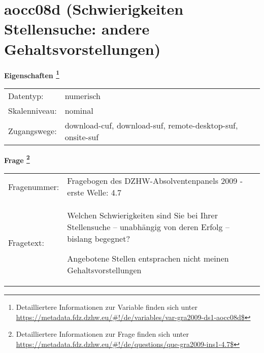 
    \setcounter{footnote}{0}

    \vspace*{-1.8cm}
	\section{aocc08d (Schwierigkeiten Stellensuche: andere Gehaltsvorstellungen)}
	\label{section:aocc08d}



    \vspace*{0.5cm}
    \noindent\textbf{Eigenschaften
	\footnote{Detailliertere Informationen zur Variable finden sich unter
		\url{https://metadata.fdz.dzhw.eu/\#!/de/variables/var-gra2009-ds1-aocc08d$}}}\\
	\begin{tabularx}{\hsize}{@{}lX}
	Datentyp: & numerisch \\
	Skalenniveau: & nominal \\
	Zugangswege: &
	  download-cuf, 
	  download-suf, 
	  remote-desktop-suf, 
	  onsite-suf
 \\
    \end{tabularx}



				\vspace*{0.5cm}
                \noindent\textbf{Frage
	                \footnote{Detailliertere Informationen zur Frage finden sich unter
		              \url{https://metadata.fdz.dzhw.eu/\#!/de/questions/que-gra2009-ins1-4.7$}}}\\
				\begin{tabularx}{\hsize}{@{}lX}
					Fragenummer: &
					  Fragebogen des DZHW-Absolventenpanels 2009 - erste Welle:
					  4.7
 \\
					Fragetext: & Welchen Schwierigkeiten sind Sie bei Ihrer Stellensuche – unabhängig von deren Erfolg – bislang begegnet?\par  Angebotene Stellen entsprachen nicht meinen Gehaltsvorstellungen \\
				\end{tabularx}





